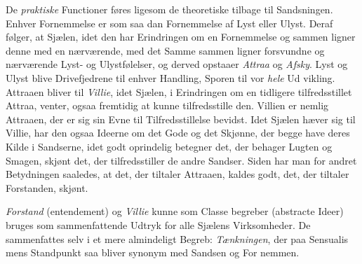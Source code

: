 \documentclass[12pt,a4paper]{book}
\begin{document}
De \emph{praktiske} Functioner føres ligesom de theoretiske
tilbage til Sandsningen. Enhver Fornemmelse er som saa\-%
dan Fornemmelse af Lyst eller Ulyst. Deraf følger, at Sjælen,
idet den har Erindringen om en Fornemmelse og sammen\-%
ligner denne med en nærværende, med det Samme sammen\-%
ligner forsvundne og nærværende Lyst- og Ulystfølelser, og
derved opstaaer \emph{Attraa} og \emph{Afsky}. Lyst og Ulyst blive
Drivefjedrene til enhver Handling, Sporen til vor \emph{hele} Ud\-%
vikling. Attraaen bliver til \emph{Villie}, idet Sjælen, i Erindringen
om en tidligere tilfredsstillet Attraa, venter, ogsaa fremtidig
at kunne tilfredsstille den. Villien er nemlig Attraaen, der er
sig sin Evne til Tilfredsstillelse bevidst. Idet Sjælen hæver
sig til Villie, har den ogsaa Ideerne om det Gode og det
Skjønne, der begge have deres Kilde i Sandserne, idet godt
oprindelig betegner det, der behager Lugten og Smagen, skjønt
det, der tilfredsstiller de andre Sandser. Siden har man for\-%
andret Betydningen saaledes, at det, der tiltaler Attraaen,
kaldes godt, det, der tiltaler Forstanden, skjønt.

\emph{Forstand} (entendement) og \emph{Villie} kunne som Classe\-%
begreber (abstracte Ideer) bruges som sammenfattende Udtryk
for alle Sjælens Virksomheder. De sammenfattes selv i et
mere almindeligt Begreb: \emph{Tænkningen}, der paa Sensualis\-%
mens Standpunkt saa bliver synonym med Sandsen og For\-%
nemmen.
\end{document}
